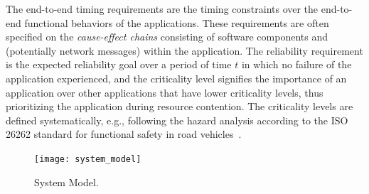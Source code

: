 The end-to-end timing requirements are the timing constraints over the end-to-end functional behaviors of the applications. These requirements are often specified on the \textit{cause-effect chains} consisting of software components and (potentially network messages) within the application. The reliability requirement is the expected reliability goal over a period of time $t$ in which no failure of the application experienced, and the criticality level signifies the importance of an application over other applications that have lower criticality levels, thus prioritizing the application during resource contention. The criticality levels are defined systematically, e.g., following the hazard analysis according to the ISO 26262 standard for functional safety in road vehicles~\cite{iso201126262}. 
 \begin{figure}[!h]
 \centering
 \texttt{[image: system\_model]}%
 \caption{System Model.}
 \label{fig_system}
 \end{figure}
